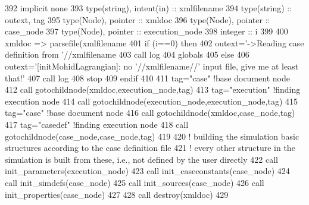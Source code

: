 \begin{DoxyCode}
392     \textcolor{keywordtype}{implicit none}
393     \textcolor{keywordtype}{type}(string), \textcolor{keywordtype}{intent(in)} :: xmlfilename
394     \textcolor{keywordtype}{type}(string) :: outext, tag
395     \textcolor{keywordtype}{type}(Node), \textcolor{keywordtype}{pointer} :: xmldoc
396     \textcolor{keywordtype}{type}(Node), \textcolor{keywordtype}{pointer} :: case\_node
397     \textcolor{keywordtype}{type}(Node), \textcolor{keywordtype}{pointer} :: execution\_node
398     \textcolor{keywordtype}{integer} :: i
399 
400     xmldoc => parsefile(xmlfilename%
401     \textcolor{keywordflow}{if} (i==0) \textcolor{keywordflow}{then}
402         outext=\textcolor{stringliteral}{'->Reading case definition from '}//xmlfilename
403         \textcolor{keyword}{call }log%
404         globals%
405     \textcolor{keywordflow}{else}
406         outext=\textcolor{stringliteral}{'[initMohidLagrangian]: no '}//xmlfilename//\textcolor{stringliteral}{' input file, give me at least that!'}
407         \textcolor{keyword}{call }log%
408         stop
409 \textcolor{keywordflow}{    endif}
410 
411     tag=\textcolor{stringliteral}{"case"}          \textcolor{comment}{!base document node}
412     \textcolor{keyword}{call }gotochildnode(xmldoc,execution\_node,tag)
413     tag=\textcolor{stringliteral}{"execution"}     \textcolor{comment}{!finding execution node}
414     \textcolor{keyword}{call }gotochildnode(execution\_node,execution\_node,tag)
415     tag=\textcolor{stringliteral}{"case"}          \textcolor{comment}{!base document node}
416     \textcolor{keyword}{call }gotochildnode(xmldoc,case\_node,tag)
417     tag=\textcolor{stringliteral}{"casedef"}     \textcolor{comment}{!finding execution node}
418     \textcolor{keyword}{call }gotochildnode(case\_node,case\_node,tag)
419 
420     \textcolor{comment}{! building the simulation basic structures according to the case definition file}
421     \textcolor{comment}{! every other structure in the simulation is built from these, i.e., not defined by the user directly}
422     \textcolor{keyword}{call }init\_parameters(execution\_node)
423     \textcolor{keyword}{call }init\_caseconstants(case\_node)
424     \textcolor{keyword}{call }init\_simdefs(case\_node)
425     \textcolor{keyword}{call }init\_sources(case\_node)
426     \textcolor{keyword}{call }init\_properties(case\_node)
427 
428     \textcolor{keyword}{call }destroy(xmldoc)
429 
\end{DoxyCode}

